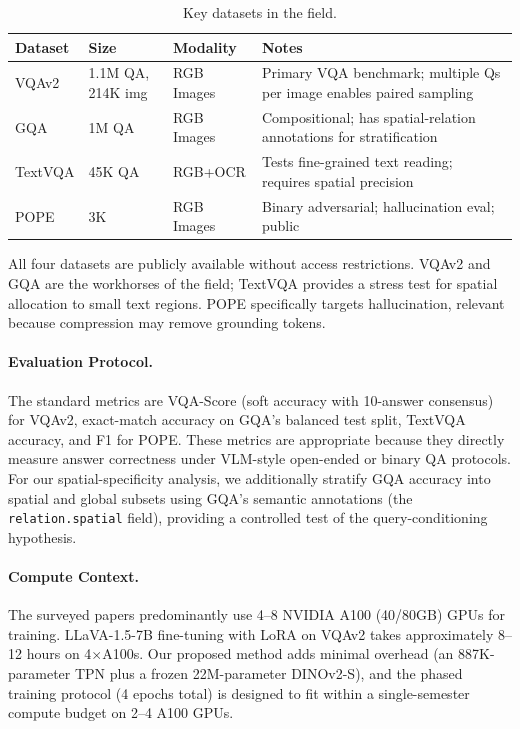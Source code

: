 \documentclass[11pt,twocolumn]{article}
\begin{document}
\begin{table}[h]
\caption{Key datasets in the field.}
\label{tab:datasets}
\vskip 0.1in
\begin{center}
\begin{small}
\begin{tabular}{p{1.5cm} p{1.2cm} p{1.3cm} p{2.2cm}}
\toprule
\textbf{Dataset} & \textbf{Size} & \textbf{Modality} 
& \textbf{Notes} \\
\midrule
VQAv2 & 1.1M QA, 214K img & RGB Images & Primary VQA benchmark; multiple Qs per image enables paired sampling \\
GQA & 1M QA & RGB Images & Compositional; has spatial-relation annotations for stratification \\
TextVQA & 45K QA & RGB+OCR & Tests fine-grained text reading; requires spatial precision \\
POPE & 3K & RGB Images & Binary adversarial; hallucination eval; public \\
\bottomrule
\end{tabular}
\end{small}
\end{center}
\end{table}

All four datasets are publicly available without access restrictions. VQAv2 and GQA are the workhorses of the field; TextVQA provides a stress test for spatial allocation to small text regions. POPE specifically targets hallucination, relevant because compression may remove grounding tokens.

\paragraph{Evaluation Protocol.}
The standard metrics are VQA-Score (soft accuracy with 10-answer consensus) for VQAv2, exact-match accuracy on GQA's balanced test split, TextVQA accuracy, and F1 for POPE. These metrics are appropriate because they directly measure answer correctness under VLM-style open-ended or binary QA protocols. For our spatial-specificity analysis, we additionally stratify GQA accuracy into spatial and global subsets using GQA's semantic annotations (the \texttt{relation.spatial} field), providing a controlled test of the query-conditioning hypothesis.

\paragraph{Compute Context.}
The surveyed papers predominantly use 4--8 NVIDIA A100 (40/80GB) GPUs for training. LLaVA-1.5-7B fine-tuning with LoRA on VQAv2 takes approximately 8--12 hours on 4$\times$A100s. Our proposed method adds minimal overhead (an 887K-parameter TPN plus a frozen 22M-parameter DINOv2-S), and the phased training protocol (4 epochs total) is designed to fit within a single-semester compute budget on 2--4 A100 GPUs.
\end{document}

